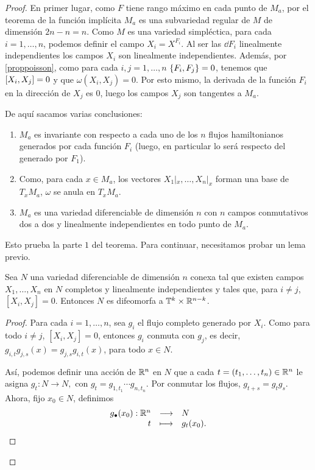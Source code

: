  \begin{proof}
  En primer lugar, como $F$ tiene rango máximo en cada punto de $M_a$, por el teorema de la función implícita $M_a$ es una subvariedad regular de $M$ de dimensión $2n-n=n$. 
  Como $M$ es una variedad simpléctica, para cada $i=1,\dots,n$, podemos definir el campo $X_i=X^{F_i}$. Al ser las $\dd F_i$ linealmente independientes los campos $X_i$ son linealmente independientes. Además, por \ref{proppoisson}, como para cada $i,j= 1,\dots,n$ $\left\lbrace F_i,F_j\right\rbrace=0$, tenemos que $\left[X_i,X_j\right]=0$ y que $\omega(X_i,X_j)=0$. Por esto mismo, la derivada de la función $F_i$ en la dirección de $X_j$ es 0, luego los campos $X_j$ son tangentes a $M_a$.

  De aquí sacamos varias conclusiones:
  \begin{enumerate}
    \item $M_a$ es invariante con respecto a cada uno de los $n$ flujos hamiltonianos generados por cada función $F_i$ (luego, en particular lo será respecto del generado por $F_1$).
    \item Como, para cada $x \in M_a$, los vectores $X_1|_x,\dots, X_n|_x$ forman una base de $T_x M_a$, $\omega$ se anula en $T_x M_a$. 
    \item $M_a$ es una variedad diferenciable de dimensión $n$ con $n$ campos conmutativos dos a dos y linealmente independientes en todo punto de $M_a$. 
  \end{enumerate}

  Esto prueba la parte $1$ del teorema. Para continuar, necesitamos probar un lema previo.

  \begin{lema}\label{lemtoro}
    Sea $N$ una variedad diferenciable de dimensión $n$ conexa tal que existen campos $X_1,\dots,X_n$ en $N$ completos y linealmente independientes y tales que, para $i\neq j$, $[X_i,X_j]=0$. Entonces $N$ es difeomorfa a $\mathbb{T}^k\times \mathbb{R}^{n-k}$. 
\end{lema}
\begin{proof}
  Para cada $i=1,\dots,n$, sea $g_i$ el flujo completo generado por $X_i$. Como para todo $i\neq j$, $[X_i,X_j]=0 $, entonces $g_i$ conmuta con $g_j$, es decir, $g_{i,t}g_{j,s} (x)=g_{j,s}g_{i,t} (x)$, para todo $x \in N$. 

  Así, podemos definir una acción de $\mathbb{R}^n$ en $N$ que a cada $t=(t_1,\dots,t_n)\in \mathbb{R}^n$ le asigna $g_t:N\rightarrow N,$ con $g_t=g_{1,t_1}\cdots g_{n,t_n}$.
Por conmutar los flujos, $g_{t+s}=g_t g_s$. Ahora, fijo $x_0 \in N$, definimos 
\[
  \begin{array}{rcl}
    g_{\bullet}(x_0):\mathbb{R}^n & \longrightarrow & N \\
t & \longmapsto & g_t (x_0).
\end{array}
\]


\end{proof}
\end{proof}
